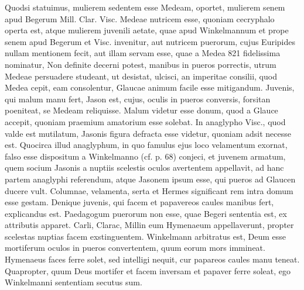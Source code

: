 \documentclass[a4paper, 11pt, oneside, polutonikogreek, german]{article}
\begin{document}
Quodsi statuimus, mulierem sedentem esse Medeam, oportet, mulierem senem apud Begerum Mill. Clar. Visc. Medeae nutricem esse, quoniam cecryphalo operta est, atque mulierem juvenili aetate, quae apud Winkelmannum et prope senem apud Begerum et Visc. invenitur, aut nutricem puerorum, cujus Euripides nullam mentionem fecit, aut illam servam esse, quae a Medea 821 fidelissima nominatur, Non definite decerni potest, manibus in pueros porrectis, utrum Medeae persuadere studeant, ut desistat, ulcisci, an imperitae consilii, quod Medea cepit, eam consolentur, Glaucae animum facile esse mitigandum. Juvenis, qui malum manu fert, Jason est, cujus, oculis in pueros conversis, forsitan poeniteat, se Medeam reliquisse. Malum videtur esse donum, quod a Glauce accepit, quoniam praemium amatorium esse solebat. In anaglypho Visc., quod valde est mutilatum, Jasonis figura defracta esse videtur, quoniam adsit necesse est. Quocirca illud anaglyphum, in quo famulus ejus loco velamentum exornat, falso esse dispositum a Winkelmanno (cf. p. 68) conjeci, et juvenem armatum, quem socium Jasonis a nuptiis scelestis oculos avertentem appellavit, ad hanc partem anaglyphi referendum, atque Jasonem ipsum esse, qui pueros ad Glaucen ducere vult. Columnae, velamenta, serta et Hermes significant rem intra domum esse gestam. Denique juvenis, qui facem et papavereos caules manibus fert, explicandus est. Paedagogum puerorum non esse, quae Begeri sententia est, ex attributis apparet. Carli, Clarac, Millin eum Hymenaeum appellaverunt, propter scelestas nuptias facem exstinguentem. Winkelmann arbitratus est, Deum esse mortiferum oculos in pueros convertentem, quum eorum mors immineat. Hymenaeus faces ferre solet, sed intelligi nequit, cur papareos caules manu teneat. Quapropter, quum Deus mortifer et facem inversam et papaver ferre soleat, ego Winkelmanni sententiam secutus sum.
\end{document}
